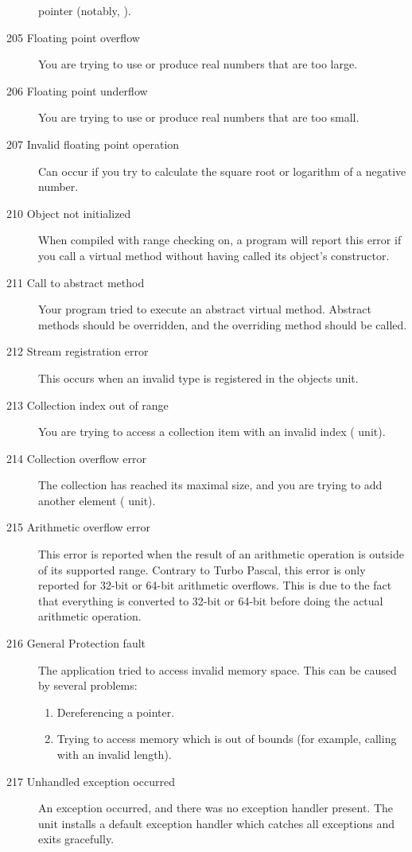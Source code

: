 \begin{description}
pointer (notably, ).
\item [205  Floating point overflow]
You are trying to use or produce real numbers that are too large.
\item [206  Floating point underflow]
You are trying to use or produce real numbers that are too small.
\item [207  Invalid floating point operation]
Can occur if you try to calculate the square root or logarithm of a negative
number.
\item [210  Object not initialized]
When compiled with range checking on, a program will report this error if
you call a virtual method without having called its object's constructor.
\item [211  Call to abstract method]
Your program tried to execute an abstract virtual method. Abstract methods
should be overridden, and the overriding method should be called.
\item [212  Stream registration error]
This occurs when an invalid type is registered in the objects unit.
\item [213  Collection index out of range]
You are trying to access a collection item with an invalid index
( unit).
\item [214  Collection overflow error]
The collection has reached its maximal size, and you are trying to add
another element ( unit).
\item[215 Arithmetic overflow error]
This error is reported when the result of an arithmetic operation
is outside of its supported range. Contrary to Turbo Pascal, this error
is only reported for 32-bit or 64-bit arithmetic overflows. This is due
to the fact that everything is converted to 32-bit or 64-bit before
doing the actual arithmetic operation.
\item [216  General Protection fault]
The application tried to access invalid memory space. This can
be caused by several problems:
\begin{enumerate}
 \item Dereferencing a  pointer.
 \item Trying to access memory which is out of bounds
       (for example, calling  with an invalid length).
\end{enumerate}

\item [217 Unhandled exception occurred]
An exception occurred, and there was no exception handler present.
The  unit installs a default exception handler which catches
all exceptions and exits gracefully.


\end{description}
